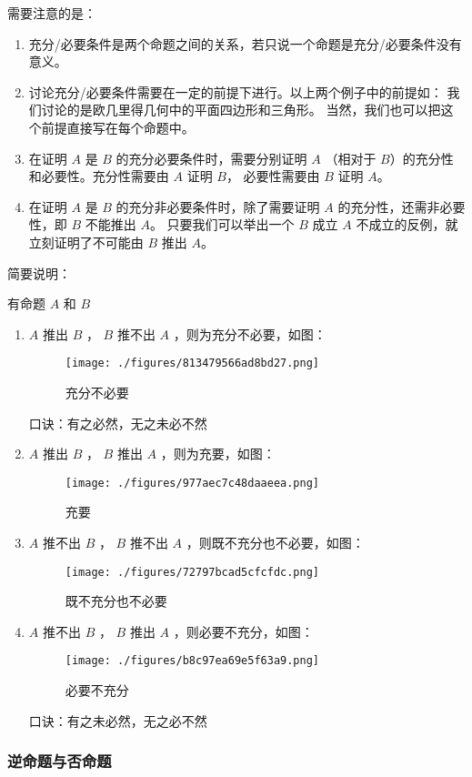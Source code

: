 需要注意的是：
\begin{enumerate}
\item 充分/必要条件是两个命题之间的关系，若只说一个命题是充分/必要条件没有意义。
\item 讨论充分/必要条件需要在一定的前提下进行。以上两个例子中的前提如： 我们讨论的是欧几里得几何中的平面四边形和三角形。 当然，我们也可以把这个前提直接写在每个命题中。
\item 在证明 $A$ 是 $B$ 的充分必要条件时，需要分别证明 $A$ （相对于 $B$）的充分性和必要性。充分性需要由 $A$ 证明 $B$， 必要性需要由 $B$ 证明 $A$。 
\item 在证明 $A$ 是 $B$ 的充分非必要条件时，除了需要证明 $A$ 的充分性，还需非必要性，即 $B$ 不能推出 $A$。 只要我们可以举出一个 $B$ 成立 $A$ 不成立的反例，就立刻证明了不可能由 $B$ 推出 $A$。 
\end{enumerate}

简要说明：

有命题 $A$ 和 $B$ 
\begin{enumerate}
\item $A$ 推出 $B$ ， $B$ 推不出 $A$ ，则为充分不必要，如图：
\begin{figure}[ht]
\centering
\texttt{[image: ./figures/813479566ad8bd27.png]}
\caption{充分不必要} \label{fig_SufCnd_2}
\end{figure}
口诀：有之必然，无之未必不然
\item $A$ 推出 $B$ ， $B$ 推出 $A$ ，则为充要，如图：\begin{figure}[ht]
\centering
\texttt{[image: ./figures/977aec7c48daaeea.png]}
\caption{充要} \label{fig_SufCnd_3}
\end{figure}
\item $A$ 推不出 $B$ ， $B$ 推不出 $A$ ，则既不充分也不必要，如图：\begin{figure}[ht]
\centering
\texttt{[image: ./figures/72797bcad5cfcfdc.png]}
\caption{既不充分也不必要} \label{fig_SufCnd_4}
\end{figure}
\item $A$ 推不出 $B$ ， $B$ 推出 $A$ ，则必要不充分，如图：\begin{figure}[ht]
\centering
\texttt{[image: ./figures/b8c97ea69e5f63a9.png]}
\caption{必要不充分} \label{fig_SufCnd_5}
\end{figure}
口诀：有之未必然，无之必不然
\end {enumerate}


\subsubsection{逆命题与否命题}

